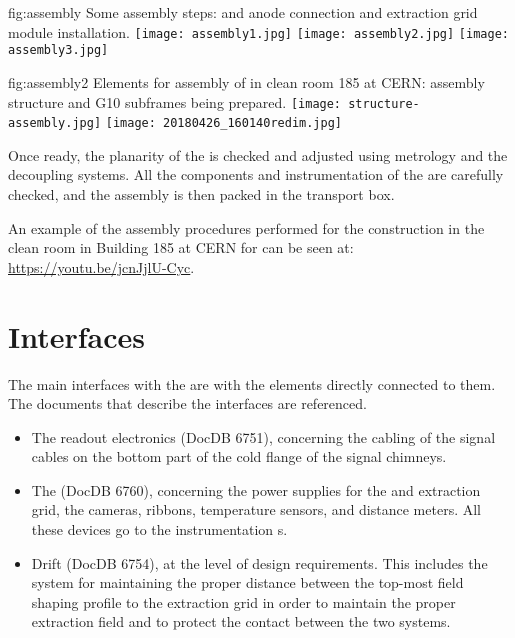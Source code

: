\begin{dunefigure}{fig:assembly}
{Some assembly steps:  and anode connection and extraction grid module installation.}
\texttt{[image: assembly1.jpg]}
\texttt{[image: assembly2.jpg]}
\texttt{[image: assembly3.jpg]}
\end{dunefigure}

\begin{dunefigure}{fig:assembly2}
{Elements for assembly of   in clean room 185 at CERN: assembly structure and G10 subframes being prepared.}
\texttt{[image: structure-assembly.jpg]}
\texttt{[image: 20180426\_160140redim.jpg]}
\end{dunefigure}
Once ready, the planarity of the  is checked and adjusted using metrology and the decoupling systems.
All the components and instrumentation of the  are carefully checked, and the assembly is then packed in the transport box.

An example of the assembly procedures performed for the   construction in the clean room in Building 185 at CERN for  can be seen at: \url{https://youtu.be/jcnJjlU-Cyc}.


\section{Interfaces}
\label{sec:fddp-crp-intfc}

The main interfaces with the  are with the elements directly connected to them. The documents that describe the interfaces are referenced.
\begin{itemize}
\item The readout electronics  (DocDB 6751), concerning the cabling of the signal cables on the bottom part of the cold 
flange of the signal chimneys.  
\item The  (DocDB 6760),  concerning the power supplies for the  and extraction grid, the cameras,  ribbons, temperature sensors, and distance meters. All these devices go to the  instrumentation \fdth{}s. 

\item Drift  (DocDB 6754), at the level of design requirements. This includes the system for maintaining the proper distance between the top-most field shaping profile to the extraction grid in order to maintain the proper extraction field and to protect the contact between the two systems.
\end{itemize}

